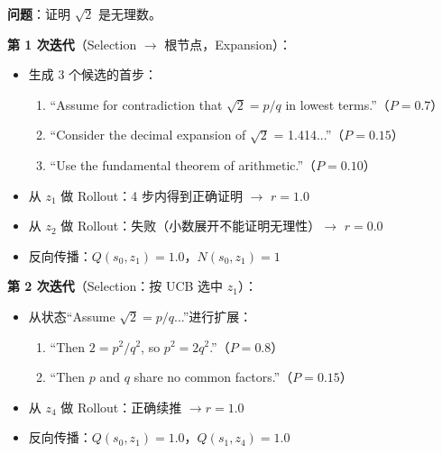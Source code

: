 \begin{examplebox}
\textbf{问题}：证明 $\sqrt{2}$ 是无理数。

\textbf{第 1 次迭代}（Selection $\to$ 根节点，Expansion）：

\begin{itemize}
  \item 生成 3 个候选的首步：

\begin{enumerate}
  \item “Assume for contradiction that $\sqrt{2} = p/q$ in lowest terms.”（$P = 0.7$）
  \item “Consider the decimal expansion of $\sqrt{2}$ = 1.414...”（$P = 0.15$）
  \item “Use the fundamental theorem of arithmetic.”（$P = 0.10$）
\end{enumerate}
  \item 从 $z_1$ 做 Rollout：4 步内得到正确证明 $\to$ $r = 1.0$
  \item 从 $z_2$ 做 Rollout：失败（小数展开不能证明无理性）$\to$ $r = 0.0$
  \item 反向传播：$Q(s_0, z_1) = 1.0$，$N(s_0, z_1) = 1$
\end{itemize}

\textbf{第 2 次迭代}（Selection：按 UCB 选中 $z_1$）：

\begin{itemize}
  \item 从状态“Assume $\sqrt{2} = p/q$...”进行扩展：

\begin{enumerate}
  \item “Then $2 = p^2/q^2$, so $p^2 = 2q^2$.”（$P = 0.8$）
  \item “Then $p$ and $q$ share no common factors.”（$P = 0.15$）
\end{enumerate}
  \item 从 $z_4$ 做 Rollout：正确续推 $\to r = 1.0$
  \item 反向传播：$Q(s_0, z_1) = 1.0$，$Q(s_1, z_4) = 1.0$
\end{itemize}


\end{examplebox}
